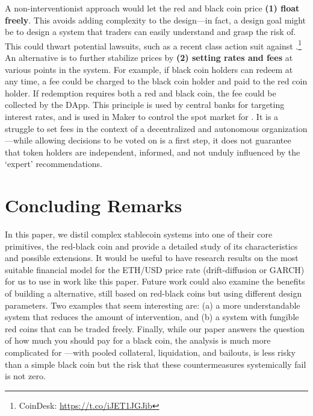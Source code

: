 A non-interventionist approach would let the red and black coin price \textbf{(1) float freely}. This avoids adding complexity to the design---in fact, a design goal might be to design a system that traders can easily understand and grasp the risk of. This could thwart potential lawsuits, such as a recent class action suit against \dai.\footnote{CoinDesk: \url{https://t.co/iJET1JGJib}} An alternative is to further stabilize prices by \textbf{(2) setting rates and fees} at various points in the system. For example, if black coin holders can redeem at any time, a fee could be charged to the black coin holder and paid to the red coin holder. If redemption requires both a red and black coin, the fee could be collected by the DApp. This principle is used by central banks for targeting interest rates, and is used in Maker to control the spot market for \dai. It is a struggle to set fees in the context of a decentralized and autonomous organization---while allowing decisions to be voted on is a first step, it does not guarantee that token holders are independent, informed, and not unduly influenced by the `expert' recommendations. 


\section{Concluding Remarks}

In this paper, we distil complex stablecoin systems into one of their core primitives, the red-black coin and provide a detailed study of its characteristics and possible extensions. It would be useful to have research results on the most suitable financial model for the ETH/USD price rate (\eg drift-diffusion or GARCH) for us to use in work like this paper. Future work could also examine the benefits of building a \dai alternative, still based on red-black coins but using different design parameters. Two examples that seem interesting are: (a) a more understandable system that reduces the amount of intervention, and (b) a system with fungible red coins that can be traded freely. Finally, while our paper answers the question of how much you should pay for a black coin, the analysis is much more complicated for \dai---with pooled collateral, liquidation, and bailouts, \dai is less risky than a simple black coin but the risk that these countermeasures systemically fail is not zero.

